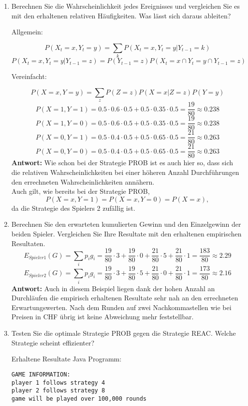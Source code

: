 \documentclass[12pt,a4paper]{article}
\begin{document}
\begin{enumerate}
\begin{enumerate}
\item Berechnen Sie die Wahrscheinlichkeit jedes Ereignisses und vergleichen Sie es mit den erhaltenen relativen Häufigkeiten.
Was lässt sich daraus ableiten?
\begin{center}Allgemein:\end{center}
$$P(X_t = x, Y_t = y) = \sum_{k} P(X_t = x, Y_t = y | Y_{t-1} = k)$$
$$P(X_t = x, Y_t = y | Y_{t-1} = z) = P(Y_{t-1} = z) P(X_t = x \cap Y_t = y \cap Y_{t-1} = z)$$
\begin{center}Vereinfacht:\end{center}
$$P(X = x, Y = y) = \sum_{z} P(Z = z) P(X = x | Z = z) P(Y = y)$$
$$P(X = 1, Y = 1) = 0.5 \cdot 0.6 \cdot 0.5 + 0.5 \cdot 0.35 \cdot 0.5 = \frac{19}{80} \approx 0.238$$
$$P(X = 1, Y = 0) = 0.5 \cdot 0.6 \cdot 0.5 + 0.5 \cdot 0.35 \cdot 0.5 = \frac{19}{80} \approx 0.238$$
$$P(X = 0, Y = 1) = 0.5 \cdot 0.4 \cdot 0.5 + 0.5 \cdot 0.65 \cdot 0.5 = \frac{21}{80} \approx 0.263$$
$$P(X = 0, Y = 0) = 0.5 \cdot 0.4 \cdot 0.5 + 0.5 \cdot 0.65 \cdot 0.5 = \frac{21}{80} \approx 0.263$$
\textbf{Antwort:} Wie schon bei der Strategie PROB ist es auch hier so, dass sich die relativen Wahrscheinlichkeiten bei einer höheren Anzahl Durchführungen den errechneten Wahrscheinlichkeiten annähern.\\
Auch gilt, wie bereits bei der Strategie PROB, $$P(X = x, Y = 1) = P(X = x, Y = 0) = P(X = x),$$ da die Strategie des Spielers 2 zufällig ist.

\item Berechnen Sie den erwarteten kumulierten Gewinn und den Einzelgewinn der beiden Spieler.
Vergleichen Sie Ihre Resultate mit den erhaltenen empirischen Resultaten.
$$E_{Spieler 1}(G) = \sum_{i} p_i g_i = \frac{19}{80} \cdot 3 + \frac{19}{80} \cdot 0 + \frac{21}{80} \cdot 5 + \frac{21}{80} \cdot 1 = \frac{183}{80} \approx 2.29$$
$$E_{Spieler 2}(G) = \sum_{i} p_i g_i = \frac{19}{80} \cdot 3 + \frac{19}{80} \cdot 5 + \frac{21}{80} \cdot 0 + \frac{21}{80} \cdot 1 = \frac{173}{80} \approx 2.16$$
\textbf{Antwort:} Auch in diesem Beispiel liegen dank der hohen Anzahl an Durchläufen die empirisch erhaltenen Resultate sehr nah an den errechneten Erwartungswerten.
Nach dem Runden auf zwei Nachkommastellen wie bei Preisen in CHF übrig ist keine Abweichung mehr feststellbar.
\newpage

\item Testen Sie die optimale Strategie PROB gegen die Strategie REAC. Welche Strategie scheint effizienter?
\begin{center}Erhaltene Resultate Java Programm:\end{center}
\begin{verbatim}
GAME INFORMATION:
player 1 follows strategy 4
player 2 follows strategy 8
game will be played over 100,000 rounds


\end{verbatim}
\end{enumerate}
\end{enumerate}
\end{document}
